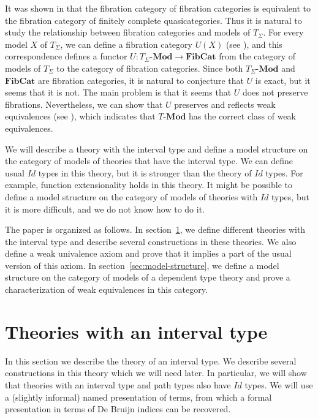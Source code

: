 \documentclass{mscs}
\newcommand{\cat}[1]{\mathbf{#1}}
\newcommand{\Mod}[1]{#1\text{-}\cat{Mod}}
\numberwithin{figure}{section}
\begin{document}
It was shown in \cite{szumilo} that the fibration category of fibration categories is equivalent to the fibration category of finitely complete quasicategories.
Thus it is natural to study the relationship between fibration categories and models of $T_\Sigma$.
For every model $X$ of $T_\Sigma$, we can define a fibration category $U(X)$ (see \cite{tt-fibr-cat}), and this correspondence defines a functor $U : \Mod{T_\Sigma} \to \cat{FibCat}$
from the category of models of $T_\Sigma$ to the category of fibration categories.
Since both $\Mod{T_\Sigma}$ and $\cat{FibCat}$ are fibration categories, it is natural to conjecture that $U$ is exact, but it seems that it is not.
The main problem is that it seems that $U$ does not preserve fibrations.
Nevertheless, we can show that $U$ preserves and reflects weak equivalences (see ), which indicates that $\Mod{T}$ has the correct class of weak equivalences.

We will describe a theory with the interval type and define a model structure on the category of models of theories that have the interval type.
We can define usual $Id$ types in this theory, but it is stronger than the theory of $Id$ types.
For example, function extensionality holds in this theory.
It might be possible to define a model structure on the category of models of theories with $Id$ types,
but it is more difficult, and we do not know how to do it.

The paper is organized as follows.
In section~\ref{sec:HoTT-I}, we define different theories with the interval type and describe several constructions in these theories.
We also define a weak univalence axiom and prove that it implies a part of the usual version of this axiom.
In section~\ref{sec:model-structure}, we define a model structure on the category of models of a dependent type theory
and prove a characterization of weak equivalences in this category.

\section{Theories with an interval type}
\label{sec:HoTT-I}

In this section we describe the theory of an interval type.
We describe several constructions in this theory which we will need later.
In particular, we will show that theories with an interval type and path types also have $Id$ types.
We will use a (slightly informal) named presentation of terms,
from which a formal presentation in terms of De Bruijn indices can be recovered.
\end{document}
